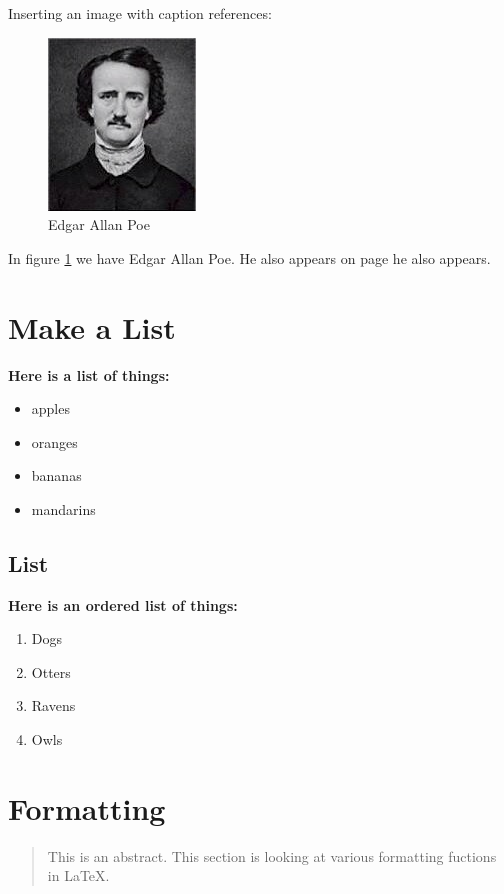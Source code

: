 \documentclass[14pt, a4paper]{article}
\begin{document}
Inserting an image with caption references:
\begin{figure}[h]
    \centering
    \includegraphics{poe.jpg}
    \caption{Edgar Allan Poe}
    \label{fig:PoeAuthor}
\end{figure}

In figure \ref{fig:PoeAuthor} we have Edgar Allan Poe. He also appears on page \pageref{fig:PoeAuthor} he also appears.

\pagebreak
\section{Make a List}

\textbf{Here is a list of things:}
\begin{itemize}
    \item apples
    \item oranges
    \item bananas
    \item mandarins
\end{itemize}

\subsection{List}
\textbf{Here is an ordered list of things:}
\begin{enumerate}
    \item Dogs
    \item Otters
    \item Ravens
    \item Owls
\end{enumerate}

\section{Formatting}
\begin{abstract}
This is an abstract. This section is looking at various formatting fuctions in LaTeX.
\end{abstract}
\end{document}
